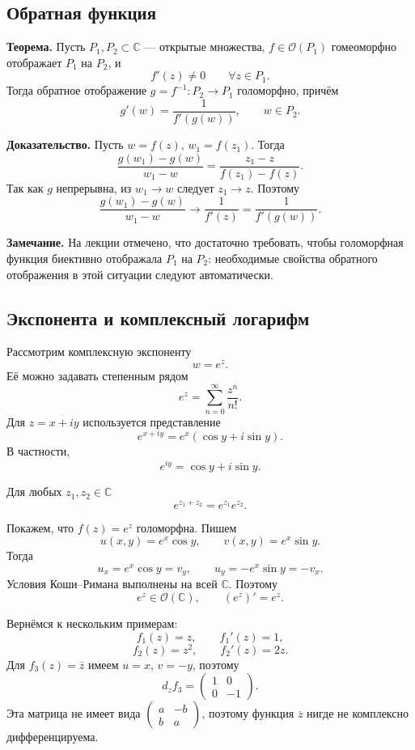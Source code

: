 \documentclass[12pt,a4paper]{article}
\newcommand{\CC}{\mathbb C}
\newcommand{\OO}{\mathcal O}
\begin{document}
\subsection{Обратная функция}

\textbf{Теорема.} Пусть \(P_1,P_2\subset\CC\) --- открытые множества,
\(f\in\OO(P_1)\) гомеоморфно отображает \(P_1\) на \(P_2\), и
\[
f'(z)\neq0\qquad \forall z\in P_1.
\]
Тогда обратное отображение \(g=f^{-1}:P_2\to P_1\) голоморфно, причём
\[
g'(w)=\frac{1}{f'(g(w))},\qquad w\in P_2.
\]

\textbf{Доказательство.}
Пусть \(w=f(z)\), \(w_1=f(z_1)\). Тогда
\[
\frac{g(w_1)-g(w)}{w_1-w}
=
\frac{z_1-z}{f(z_1)-f(z)}.
\]
Так как \(g\) непрерывна, из \(w_1\to w\) следует \(z_1\to z\). Поэтому
\[
\frac{g(w_1)-g(w)}{w_1-w}
\longrightarrow
\frac{1}{f'(z)}
=
\frac{1}{f'(g(w))}.
\]

\textbf{Замечание.} На лекции отмечено, что достаточно требовать, чтобы
голоморфная функция биективно отображала \(P_1\) на \(P_2\): необходимые
свойства обратного отображения в этой ситуации следуют автоматически.

\subsection{Экспонента и комплексный логарифм}

Рассмотрим комплексную экспоненту
\[
w=e^z.
\]
Её можно задавать степенным рядом
\[
e^z=\sum\limits_{n=0}^{\infty}\frac{z^n}{n!}.
\]
Для \(z=x+iy\) используется представление
\[
e^{x+iy}=e^x(\cos y+i\sin y).
\]
В частности,
\[
e^{iy}=\cos y+i\sin y.
\]

Для любых \(z_1,z_2\in\CC\)
\[
e^{z_1+z_2}=e^{z_1}e^{z_2}.
\]

Покажем, что \(f(z)=e^z\) голоморфна. Пишем
\[
u(x,y)=e^x\cos y,\qquad v(x,y)=e^x\sin y.
\]
Тогда
\[
u_x=e^x\cos y=v_y,
\qquad
u_y=-e^x\sin y=-v_x.
\]
Условия Коши--Римана выполнены на всей \(\CC\). Поэтому
\[
e^z\in\OO(\CC),
\qquad
(e^z)'=e^z.
\]

Вернёмся к нескольким примерам:
\[
f_1(z)=z,\qquad f_1'(z)=1,
\]
\[
f_2(z)=z^2,\qquad f_2'(z)=2z.
\]
Для \(f_3(z)=\overline z\) имеем \(u=x\), \(v=-y\), поэтому
\[
d_zf_3=
\begin{pmatrix}
1&0\\
0&-1
\end{pmatrix}.
\]
Эта матрица не имеет вида
\(\begin{pmatrix}a&-b\\ b&a\end{pmatrix}\), поэтому функция
\(\overline z\) нигде не комплексно дифференцируема.
\end{document}
